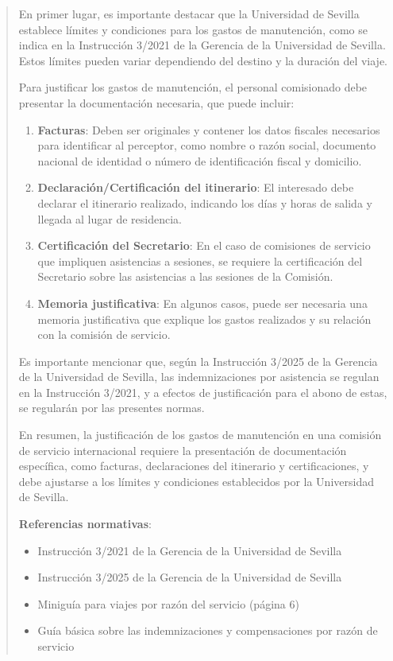 \documentclass[12pt,a4paper,oneside]{report}
\begin{document}
\begin{itemize}
\begin{itemize}
\begin{quote}
En primer lugar, es importante destacar que la Universidad de Sevilla establece límites y condiciones para los gastos de manutención, como se indica en la Instrucción 3/2021 de la Gerencia de la Universidad de Sevilla. Estos límites pueden variar dependiendo del destino y la duración del viaje.

Para justificar los gastos de manutención, el personal comisionado debe presentar la documentación necesaria, que puede incluir:

\begin{enumerate}
  \item \textbf{Facturas}: Deben ser originales y contener los datos fiscales necesarios para identificar al perceptor, como nombre o razón social, documento nacional de identidad o número de identificación fiscal y domicilio.
  \item \textbf{Declaración/Certificación del itinerario}: El interesado debe declarar el itinerario realizado, indicando los días y horas de salida y llegada al lugar de residencia.
  \item \textbf{Certificación del Secretario}: En el caso de comisiones de servicio que impliquen asistencias a sesiones, se requiere la certificación del Secretario sobre las asistencias a las sesiones de la Comisión.
  \item \textbf{Memoria justificativa}: En algunos casos, puede ser necesaria una memoria justificativa que explique los gastos realizados y su relación con la comisión de servicio.
\end{enumerate}

Es importante mencionar que, según la Instrucción 3/2025 de la Gerencia de la Universidad de Sevilla, las indemnizaciones por asistencia se regulan en la Instrucción 3/2021, y a efectos de justificación para el abono de estas, se regularán por las presentes normas.

En resumen, la justificación de los gastos de manutención en una comisión de servicio internacional requiere la presentación de documentación específica, como facturas, declaraciones del itinerario y certificaciones, y debe ajustarse a los límites y condiciones establecidos por la Universidad de Sevilla.

\textbf{Referencias normativas}:

\begin{itemize}
  \item Instrucción 3/2021 de la Gerencia de la Universidad de Sevilla
  \item Instrucción 3/2025 de la Gerencia de la Universidad de Sevilla
  \item Miniguía para viajes por razón del servicio (página 6)
  \item Guía básica sobre las indemnizaciones y compensaciones por razón de servicio
\end{itemize}


\end{quote}
\end{itemize}
\end{itemize}
\end{document}
